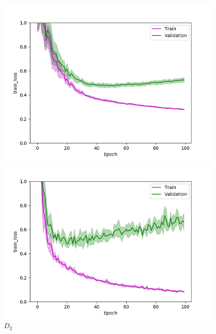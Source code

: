 \def\year{2017}\relax \documentclass[letterpaper]{article}
\begin{document}
\begin{figure}
\centering
\begin{minipage}{.24\textwidth}
  \centering
\includegraphics[width=\textwidth]{pics/d1_train_loss_mean_train_test.png}
\caption{$D_1$}\label{fig:d1lossraintest}
\end{minipage}
\begin{minipage}{.01\textwidth}
\end{minipage}
\begin{minipage}{.24\textwidth}
  \centering
\includegraphics[width=\textwidth]{pics/d2_train_loss_mean_train_test.png}
\caption{$D_2$}\label{fig:d2losstraintest}
\end{minipage}
\begin{minipage}{.24\textwidth}

\end{minipage}
\end{figure}
\end{document}
